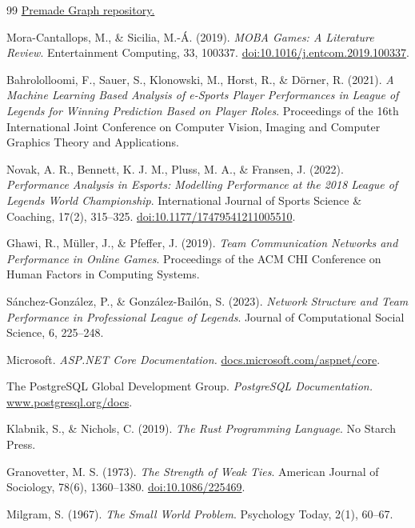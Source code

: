 ﻿\documentclass[a4paper,12pt]{report}
\begin{document}
\begin{thebibliography}{99}
\href{https://github.com/wpowertechgit/premadegraph}{Premade Graph repository.}

Mora-Cantallops, M., \& Sicilia, M.-Á. (2019). \textit{MOBA Games: A Literature Review}. Entertainment Computing, 33, 100337. \href{https://doi.org/10.1016/j.entcom.2019.100337}{doi:10.1016/j.entcom.2019.100337}.

Bahrololloomi, F., Sauer, S., Klonowski, M., Horst, R., \& Dörner, R. (2021). \textit{A Machine Learning Based Analysis of e-Sports Player Performances in League of Legends for Winning Prediction Based on Player Roles}. Proceedings of the 16th International Joint Conference on Computer Vision, Imaging and Computer Graphics Theory and Applications.

Novak, A. R., Bennett, K. J. M., Pluss, M. A., \& Fransen, J. (2022). \textit{Performance Analysis in Esports: Modelling Performance at the 2018 League of Legends World Championship}. International Journal of Sports Science \& Coaching, 17(2), 315--325. \href{https://doi.org/10.1177/17479541211005510}{doi:10.1177/17479541211005510}.

Ghawi, R., Müller, J., \& Pfeffer, J. (2019). \textit{Team Communication Networks and Performance in Online Games}. Proceedings of the ACM CHI Conference on Human Factors in Computing Systems.

Sánchez-González, P., \& González-Bailón, S. (2023). \textit{Network Structure and Team Performance in Professional League of Legends}. Journal of Computational Social Science, 6, 225--248.

Microsoft. \textit{ASP.NET Core Documentation.} \href{https://docs.microsoft.com/en-us/aspnet/core/}{docs.microsoft.com/aspnet/core}.

The PostgreSQL Global Development Group. \textit{PostgreSQL Documentation.} \href{https://www.postgresql.org/docs/}{www.postgresql.org/docs}.

Klabnik, S., \& Nichols, C. (2019). \textit{The Rust Programming Language}. No Starch Press.

Granovetter, M. S. (1973). \textit{The Strength of Weak Ties}. American Journal of Sociology, 78(6), 1360--1380. \href{https://doi.org/10.1086/225469}{doi:10.1086/225469}.

Milgram, S. (1967). \textit{The Small World Problem}. Psychology Today, 2(1), 60--67.

\end{thebibliography}
\end{document}
